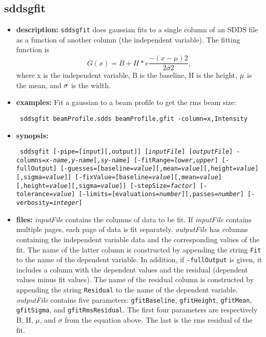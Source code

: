 \newpage
\subsection{sddsgfit}
\label{sddsgfit}

\begin{itemize}
\item {\bf description:}
{\tt sddsgfit} does gaussian fits to a single column of an SDDS file as a function of another column (the independent 
variable).  The fitting function is
\[ G(x) = B + H * e \frac{-(x-\mu) 2}{2 \sigma 2}, \]
where x is the independent variable, B is the baseline, H is the height, ${\rm \mu}$ is the mean,
and ${\rm \sigma}$ is the width.

\item {\bf examples:} 
Fit a gaussian to a beam profile to get the rms beam size:
\begin{flushleft}{\tt
sddsgfit beamProfile.sdds beamProfile.gfit -column=x,Intensity 
}\end{flushleft}
\item {\bf synopsis:} 
\begin{flushleft}{\tt
sddsgfit [-pipe=[input][,output]] [{\em inputFile}] [{\em outputFile}] 
-columns={\em x-name},{\em y-name}[,{\em sy-name}] 
[-fitRange={\em lower},{\em upper}] [-fullOutput] 
[-guesses=[baseline={\em value}][,mean={\em value}][,height={\em value}][,sigma={\em value}]] 
[-fixValue=[baseline={\em value}][,mean={\em value}][,height={\em value}][,sigma={\em value}]] 
[-stepSize={\em factor}] [-tolerance={\em value}] 
[-limits=[evaluations={\em number}][,passes={\em number}]
[-verbosity={\em integer}] 
}\end{flushleft}
\item {\bf files:}
{\em inputFile} contains the columns of data to be fit.  If {\em inputFile} contains multiple
pages, each page of data is fit separately.  {\em outputFile} has columns containing the
independent variable data and the corresponding values of the fit.  The name of the latter
column is constructed by appending the string {\tt Fit} to the name of the dependent variable.
In addition, if {\tt -fullOutput} is given, it includes a column with the dependent values and
the residual (dependent values minus fit values).  The name of the residual column is
constructed by appending the string {\tt Residual} to the name of the dependent variable.  {\em
outputFile} contains five parameters: {\tt gfitBaseline}, {\tt gfitHeight}, {\tt gfitMean},
{\tt gfitSigma}, and {\tt gfitRmsResidual}.  The first four parameters are respectively B, H,
$\mu$, and $\sigma$ from the equation above.  The last is the rms residual of the fit.


\end{itemize}
